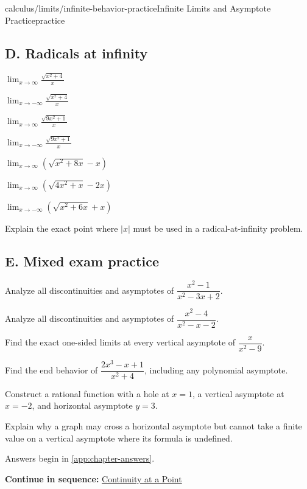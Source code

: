 \documentclass[11pt,openany]{book}
\theoremstyle{bgplain}
\newcommand{\webnext}[2]{%
  \par\addvspace{1.2em}\noindent{\color{BGLine}\rule{\textwidth}{0.35pt}}\par\smallskip
  {\small\color{BGGray}\textbf{Continue in sequence:} \hyperlink{web:#1}{#2}}\par
}
\begin{document}
\begin{webpage}{calculus/limits/infinite-behavior-practice}{Infinite Limits and Asymptote Practice}{practice}
\subsection*{D. Radicals at infinity}
\begin{bgexercises}[label=\textbf{4.\arabic*},resume]
  \item \(\displaystyle\lim_{x\to\infty}\frac{\sqrt{x^2+4}}{x}\)
  \item \(\displaystyle\lim_{x\to-\infty}\frac{\sqrt{x^2+4}}{x}\)
  \item \(\displaystyle\lim_{x\to\infty}\frac{\sqrt{9x^2+1}}{x}\)
  \item \(\displaystyle\lim_{x\to-\infty}\frac{\sqrt{9x^2+1}}{x}\)
  \item \(\displaystyle\lim_{x\to\infty}\left(\sqrt{x^2+8x}-x\right)\)
  \item \(\displaystyle\lim_{x\to\infty}\left(\sqrt{4x^2+x}-2x\right)\)
  \item \(\displaystyle\lim_{x\to-\infty}\left(\sqrt{x^2+6x}+x\right)\)
  \item Explain the exact point where \(|x|\) must be used in a radical-at-infinity problem.
\end{bgexercises}

\subsection*{E. Mixed exam practice}
\begin{bgexercises}[label=\textbf{4.\arabic*},resume]
  \item Analyze all discontinuities and asymptotes of \(\dfrac{x^2-1}{x^2-3x+2}\).
  \item Analyze all discontinuities and asymptotes of \(\dfrac{x^2-4}{x^2-x-2}\).
  \item Find the exact one-sided limits at every vertical asymptote of \(\dfrac{x}{x^2-9}\).
  \item Find the end behavior of \(\dfrac{2x^3-x+1}{x^2+4}\), including any polynomial asymptote.
  \item Construct a rational function with a hole at \(x=1\), a vertical asymptote at \(x=-2\), and horizontal asymptote \(y=3\).
  \item Explain why a graph may cross a horizontal asymptote but cannot take a finite value on a vertical asymptote where its formula is undefined.
\end{bgexercises}

Answers begin in \cref{app:chapter-answers}.
\webnext{calculus/continuity/continuity-at-a-point}{Continuity at a Point}
\end{webpage}
\end{document}
